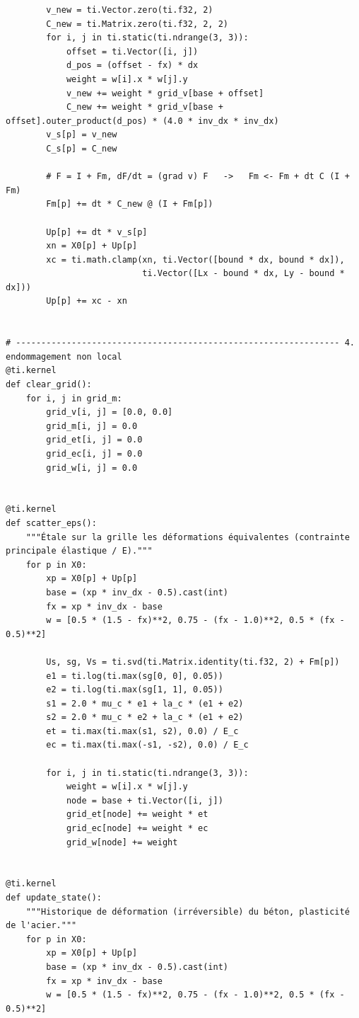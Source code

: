 \documentclass[11pt,a4paper]{article}
\begin{document}
\begin{lstlisting}
        v_new = ti.Vector.zero(ti.f32, 2)
        C_new = ti.Matrix.zero(ti.f32, 2, 2)
        for i, j in ti.static(ti.ndrange(3, 3)):
            offset = ti.Vector([i, j])
            d_pos = (offset - fx) * dx
            weight = w[i].x * w[j].y
            v_new += weight * grid_v[base + offset]
            C_new += weight * grid_v[base + offset].outer_product(d_pos) * (4.0 * inv_dx * inv_dx)
        v_s[p] = v_new
        C_s[p] = C_new

        # F = I + Fm, dF/dt = (grad v) F   ->   Fm <- Fm + dt C (I + Fm)
        Fm[p] += dt * C_new @ (I + Fm[p])

        Up[p] += dt * v_s[p]
        xn = X0[p] + Up[p]
        xc = ti.math.clamp(xn, ti.Vector([bound * dx, bound * dx]),
                           ti.Vector([Lx - bound * dx, Ly - bound * dx]))
        Up[p] += xc - xn


# ---------------------------------------------------------------- 4. endommagement non local
@ti.kernel
def clear_grid():
    for i, j in grid_m:
        grid_v[i, j] = [0.0, 0.0]
        grid_m[i, j] = 0.0
        grid_et[i, j] = 0.0
        grid_ec[i, j] = 0.0
        grid_w[i, j] = 0.0


@ti.kernel
def scatter_eps():
    """Étale sur la grille les déformations équivalentes (contrainte principale élastique / E)."""
    for p in X0:
        xp = X0[p] + Up[p]
        base = (xp * inv_dx - 0.5).cast(int)
        fx = xp * inv_dx - base
        w = [0.5 * (1.5 - fx)**2, 0.75 - (fx - 1.0)**2, 0.5 * (fx - 0.5)**2]

        Us, sg, Vs = ti.svd(ti.Matrix.identity(ti.f32, 2) + Fm[p])
        e1 = ti.log(ti.max(sg[0, 0], 0.05))
        e2 = ti.log(ti.max(sg[1, 1], 0.05))
        s1 = 2.0 * mu_c * e1 + la_c * (e1 + e2)
        s2 = 2.0 * mu_c * e2 + la_c * (e1 + e2)
        et = ti.max(ti.max(s1, s2), 0.0) / E_c
        ec = ti.max(ti.max(-s1, -s2), 0.0) / E_c

        for i, j in ti.static(ti.ndrange(3, 3)):
            weight = w[i].x * w[j].y
            node = base + ti.Vector([i, j])
            grid_et[node] += weight * et
            grid_ec[node] += weight * ec
            grid_w[node] += weight


@ti.kernel
def update_state():
    """Historique de déformation (irréversible) du béton, plasticité de l'acier."""
    for p in X0:
        xp = X0[p] + Up[p]
        base = (xp * inv_dx - 0.5).cast(int)
        fx = xp * inv_dx - base
        w = [0.5 * (1.5 - fx)**2, 0.75 - (fx - 1.0)**2, 0.5 * (fx - 0.5)**2]


\end{lstlisting}
\end{document}
